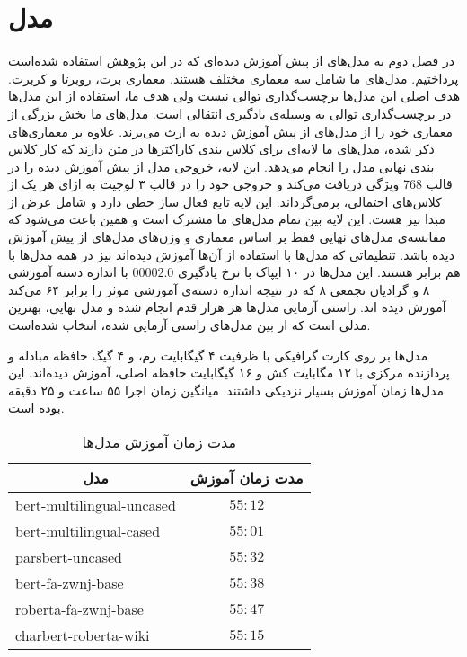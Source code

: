 \section{مدل}
\hspace{30pt}
در فصل دوم به مدل‌های از پیش آموزش دیده‌ای که در این پژوهش استفاده شده‌است پرداختیم. مدل‌های ما شامل سه معماری مختلف هستند. معماری برت، روبرتا و کربرت. هدف اصلی این مدل‌ها برچسب‌گذاری توالی نیست ولی هدف ما، استفاده از این مدل‌ها در برچسب‌گذاری توالی به وسیله‌ی یادگیری انتقالی است. مدل‌های ما بخش بزرگی از معماری خود را از مدل‌های از پیش آموزش دیده به ارث می‌برند. علاوه بر معماری‌های ذکر شده، مدل‌های ما لایه‌ای برای کلاس‌ بندی کاراکتر‌ها در متن دارند که کار کلاس بندی نهایی مدل را انجام می‌دهد. این لایه، خروجی مدل از پیش آموزش دیده را در قالب  768 ویژگی دریافت می‌کند و خروجی خود را در قالب ۳ لوجیت به ازای هر یک از کلاس‌های احتمالی، برمی‌گرداند. این لایه تابع فعال ساز خطی دارد و شامل عرض از مبدا نیز هست.  این لایه بین تمام مدل‌های ما مشترک است و همین باعث می‌شود که مقابسه‌ی مدل‌های نهایی فقط بر اساس معماری و وزن‌های مدل‌های از پیش آموزش دیده باشد.
 تنظیماتی که مدل‌ها با استفاده از آن‌ها آموزش دیده‌اند نیز در همه مدل‌ها با هم برابر هستند. این مدل‌ها در ۱۰ ایپاک با نرخ یادگیری 00002.0 با اندازه دسته آموزشی ۸ و گرادیان تجمعی ۸ که در نتیجه اندازه دسته‌ی آموزشی موثر را برابر ۶۴ می‌کند آموزش دیده اند. راستی آزمایی مدل‌ها هر هزار قدم انجام شده و مدل نهایی، بهترین مدلی است که از بین مدل‌های راستی آزمایی شده‌، انتخاب شده‌است.

مدل‌ها بر روی  کارت گرافیکی  با ظرفیت ۴ گیگابایت رم، و ۴ گیگ حافظه مبادله و پردازنده مرکزی   با ۱۲ مگابایت کش و ۱۶ گیگابایت حافظه اصلی، آموزش دیده‌اند. این مدل‌ها زمان آموزش بسیار نزدیکی داشتند. میانگین زمان اجرا ۵۵ ساعت و ۲۵ دقیقه بوده است.

\begin{table}[H]
 \centering
     \caption{مدت زمان آموزش مدل‌ها}
    \label{tab:model_times}
\begin{tabular}{|lc|}
\hline
\multicolumn{1}{|c|}{\textbf{مدل}} & \textbf{مدت زمان آموزش}  \\
\hline
bert-multilingual-uncased          & $55:12$                  \\
\hline
bert-multilingual-cased            & $55:01$                  \\
\hline
parsbert-uncased                   & $55:32$                  \\
\hline
bert-fa-zwnj-base                  & $55:38$                  \\
\hline
roberta-fa-zwnj-base               & $55:47$                  \\
\hline
charbert-roberta-wiki              & $55:15$                  \\
\hline
\end{tabular}
\end{table}
